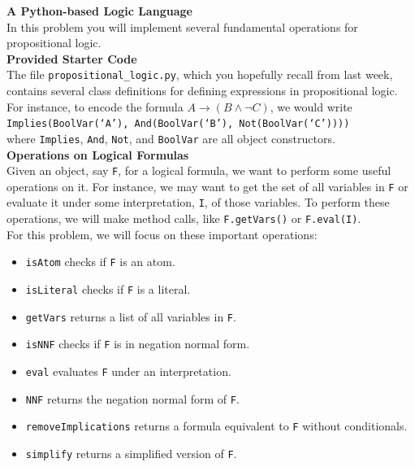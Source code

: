 \documentclass[12pt]{article}
\newenvironment{problem}[2][Problem]{\begin{trivlist}
\item[\hskip \labelsep {\bfseries #1}\hskip \labelsep {\bfseries #2.}]}{\end{trivlist}}
\begin{document}


\newpage

\begin{problem}{2} \textbf{A Python-based Logic Language} \\

In this problem you will implement several fundamental operations for propositional logic. \\

\textbf{Provided Starter Code} \\

The file \texttt{propositional\_logic.py}, which you hopefully recall from last week, contains several class definitions for defining expressions in propositional logic. For instance, to encode the formula 
$A \rightarrow (B \land \neg C)$, 
we would write \\

\texttt{Implies(BoolVar(`A'), And(BoolVar(`B'), Not(BoolVar(`C'))))} \\

where \texttt{Implies}, \texttt{And}, \texttt{Not}, and \texttt{BoolVar} are all object constructors. \\

\textbf{Operations on Logical Formulas} \\

Given an object, say \texttt{F}, for a logical formula, we want to perform some useful operations on it. For instance, we may want to get the set of all variables in \texttt{F} or evaluate it under some interpretation, \texttt{I}, of those variables. To perform these operations, we will make method calls, like \texttt{F.getVars()} or \texttt{F.eval(I)}. \\



For this problem, we will focus on these important operations: \\

\begin{itemize}
\item \texttt{isAtom} checks if \texttt{F} is an atom.
\item \texttt{isLiteral} checks if \texttt{F} is a literal.
\item \texttt{getVars} returns a list of all variables in \texttt{F}.
\item \texttt{isNNF} checks if \texttt{F} is in negation normal form.
\item \texttt{eval} evaluates \texttt{F} under an interpretation.
\item \texttt{NNF} returns the negation normal form of \texttt{F}.
\item \texttt{removeImplications} returns a formula equivalent to \texttt{F} without conditionals.
\item \texttt{simplify} returns a simplified version of \texttt{F}.
\end{itemize}


\end{problem}
\end{document}
